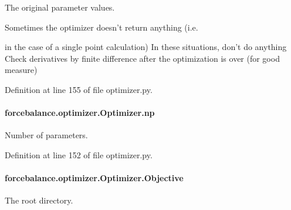The original parameter values. 

Sometimes the optimizer doesn't return anything (i.\-e.

in the case of a single point calculation) In these situations, don't do anything Check derivatives by finite difference after the optimization is over (for good measure) 

Definition at line 155 of file optimizer.\-py.

\hypertarget{classforcebalance_1_1optimizer_1_1Optimizer_af198da71b849e8e10611bf16ea5914cf}{
\paragraph[{np}]{\setlength{\rightskip}{0pt plus 5cm}forcebalance.\-optimizer.\-Optimizer.\-np}}\label{classforcebalance_1_1optimizer_1_1Optimizer_af198da71b849e8e10611bf16ea5914cf}


Number of parameters. 



Definition at line 152 of file optimizer.\-py.

\hypertarget{classforcebalance_1_1optimizer_1_1Optimizer_a485c636c02ff86bb7709a44582c7693e}{
\paragraph[{Objective}]{\setlength{\rightskip}{0pt plus 5cm}forcebalance.\-optimizer.\-Optimizer.\-Objective}}\label{classforcebalance_1_1optimizer_1_1Optimizer_a485c636c02ff86bb7709a44582c7693e}


The root directory. 

